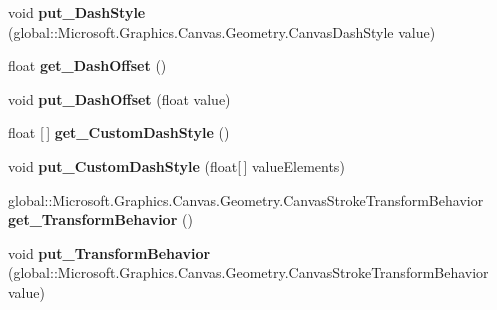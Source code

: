 \begin{DoxyCompactItemize}
void {\bfseries put\+\_\+\+Dash\+Style} (global\+::\+Microsoft.\+Graphics.\+Canvas.\+Geometry.\+Canvas\+Dash\+Style value)
\item 
\mbox{\label{class_microsoft_1_1_graphics_1_1_canvas_1_1_geometry_1_1_canvas_stroke_style_ad6a5cdd86562a8dfdb8e856ccf7227dc}} 
float {\bfseries get\+\_\+\+Dash\+Offset} ()
\item 
\mbox{\label{class_microsoft_1_1_graphics_1_1_canvas_1_1_geometry_1_1_canvas_stroke_style_a01c2250f29f3c8b71ac14ac77e246dff}} 
void {\bfseries put\+\_\+\+Dash\+Offset} (float value)
\item 
\mbox{\label{class_microsoft_1_1_graphics_1_1_canvas_1_1_geometry_1_1_canvas_stroke_style_aed5aa05f608f3835623113c1f789483d}} 
float \mbox{[}$\,$\mbox{]} {\bfseries get\+\_\+\+Custom\+Dash\+Style} ()
\item 
\mbox{\label{class_microsoft_1_1_graphics_1_1_canvas_1_1_geometry_1_1_canvas_stroke_style_aeae34150ee1e2fcb07c434a9371be1da}} 
void {\bfseries put\+\_\+\+Custom\+Dash\+Style} (float\mbox{[}$\,$\mbox{]} value\+Elements)
\item 
\mbox{\label{class_microsoft_1_1_graphics_1_1_canvas_1_1_geometry_1_1_canvas_stroke_style_a26b6c215fb7192fa54e07e53785f0568}} 
global\+::\+Microsoft.\+Graphics.\+Canvas.\+Geometry.\+Canvas\+Stroke\+Transform\+Behavior {\bfseries get\+\_\+\+Transform\+Behavior} ()
\item 
\mbox{\label{class_microsoft_1_1_graphics_1_1_canvas_1_1_geometry_1_1_canvas_stroke_style_acc734915b10b7dd019e5423b04d56a48}} 
void {\bfseries put\+\_\+\+Transform\+Behavior} (global\+::\+Microsoft.\+Graphics.\+Canvas.\+Geometry.\+Canvas\+Stroke\+Transform\+Behavior value)
\item 
\mbox{\label{class_microsoft_1_1_graphics_1_1_canvas_1_1_geometry_1_1_canvas_stroke_style_a84473c4c8d10c25462fa224a25dae41b}} 

\end{DoxyCompactItemize}
